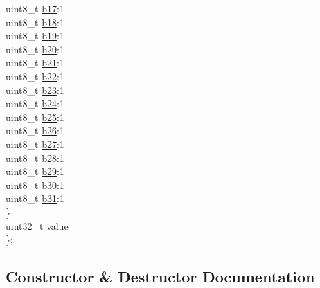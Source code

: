 \begin{DoxyCompactItemize}
\begin{tabbing}
\>\>uint8\_t \hyperlink{struct_b_o_o_l32_a954eb2fcf4d281b206d8e99ba1740ee9}{b17}:1\\
\>\>uint8\_t \hyperlink{struct_b_o_o_l32_ae0a4d950647d4fac9cb20f7e29516bc6}{b18}:1\\
\>\>uint8\_t \hyperlink{struct_b_o_o_l32_aefb41a8da65649ab100c79563185fb72}{b19}:1\\
\>\>uint8\_t \hyperlink{struct_b_o_o_l32_aff33443afd6538991cf18479f3869adb}{b20}:1\\
\>\>uint8\_t \hyperlink{struct_b_o_o_l32_a74c9adb5c81e2174331072bca9318e31}{b21}:1\\
\>\>uint8\_t \hyperlink{struct_b_o_o_l32_afdbfecb548cd8afe357ee6bebfbb324d}{b22}:1\\
\>\>uint8\_t \hyperlink{struct_b_o_o_l32_a952f91aa93fd5d7aade9a56845dc4de6}{b23}:1\\
\>\>uint8\_t \hyperlink{struct_b_o_o_l32_a193404178c473bf772487056eda4bd51}{b24}:1\\
\>\>uint8\_t \hyperlink{struct_b_o_o_l32_a0baa46107d9d3cf247a19f67d7605262}{b25}:1\\
\>\>uint8\_t \hyperlink{struct_b_o_o_l32_afaf6c339774439448615ccb5fe503983}{b26}:1\\
\>\>uint8\_t \hyperlink{struct_b_o_o_l32_a69a730eb737496da415265ec0666e380}{b27}:1\\
\>\>uint8\_t \hyperlink{struct_b_o_o_l32_a50f78f63a2dcf3c861918d07a887f80d}{b28}:1\\
\>\>uint8\_t \hyperlink{struct_b_o_o_l32_aa6221372ff8300c8770ccc453b771371}{b29}:1\\
\>\>uint8\_t \hyperlink{struct_b_o_o_l32_ae40d7746427401204e58a08df5b05362}{b30}:1\\
\>\>uint8\_t \hyperlink{struct_b_o_o_l32_a72b1e721a9693db3cdf462c475c11d4b}{b31}:1\\
\>\} \\
\>uint32\_t \hyperlink{struct_b_o_o_l32_af4c721aad4bfef99160e40d6dabd044f}{value}\\
\}; \\

\end{tabbing}\end{DoxyCompactItemize}


\subsection{Constructor \& Destructor Documentation}
\hypertarget{struct_b_o_o_l32_ab77067628ae79e5356d4d07379defee4}{}\label{struct_b_o_o_l32_ab77067628ae79e5356d4d07379defee4} 
